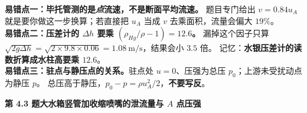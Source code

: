 \begin{yicuo}
\textbf{易错点一：毕托管测的是\emph{点}流速，不是断面平均流速。}
题目专门给出 $v=0.84u_A$ 就是要你做这一步换算；若直接把 $u_A$ 当成 $v$ 去乘面积，流量会偏大 $19\%$。\\
\textbf{易错点二：压差计的 $\Delta h$ 要乘 $(\rho_{Hg}/\rho-1)=12.6$。}
漏掉这个因子只算 $\sqrt{2g\Delta h}=\sqrt{2\times9.8\times0.06}=1.08\ \mathrm{m/s}$，结果会小 $3.5$ 倍。
记忆：\textbf{水银压差计的读数折算成水柱高要乘 $12.6$}。\\
\textbf{易错点三：驻点与静压点的关系。}驻点处 $u=0$、压强为总压 $p_0$；上游未受扰动点为静压 $p$。
总压高于静压，$p_0-p=\rho u_A^2/2$，\textbf{不要写反}。
\end{yicuo}

\noindent\textbf{第 4.3 题\quad 大水箱竖管加收缩喷嘴的泄流量与 $A$ 点压强}

